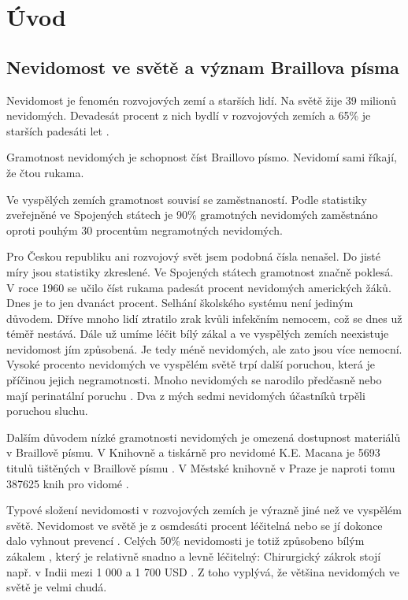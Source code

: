 
\chapter{Úvod}

\section{Nevidomost ve světě a význam Braillova písma}

Nevidomost je fenomén rozvojových zemí a starších lidí. Na světě žije 39 milionů nevidomých. Devadesát procent z nich bydlí v rozvojových zemích a 65\% je starších padesáti let \citep{whodata}.

Gramotnost nevidomých je schopnost číst Braillovo písmo.  Nevidomí sami říkají, že čtou rukama.

Ve vyspělých zemích gramotnost souvisí se zaměstnaností. Podle statistiky zveřejněné ve Spojených státech je 90\% gramotných nevidomých zaměstnáno oproti pouhým 30 procentům negramotných nevidomých.

Pro Českou republiku ani rozvojový svět jsem podobná čísla nenašel.  Do jisté míry jsou statistiky zkreslené.  Ve Spojených státech gramotnost značně poklesá.  V roce 1960 se učilo číst rukama padesát procent nevidomých amerických žáků. Dnes je to jen dvanáct procent.  Selhání školského systému není jediným důvodem. Dříve mnoho lidí ztratilo zrak kvůli infekčním nemocem, což se dnes už téměř nestává. Dále už umíme léčit bílý zákal a ve vyspělých zemích neexistuje nevidomost jím způsobená.  Je tedy méně nevidomých, ale zato jsou více nemocní.  Vysoké procento nevidomých ve vyspělém světě trpí další poruchou, která je příčinou jejich negramotnosti.  Mnoho nevidomých se narodilo předčasně nebo mají perinatální poruchu  \citep{perkins,whozakal,whodata}.  Dva z mých sedmi nevidomých účastníků trpěli poruchou sluchu.

Dalším důvodem nízké gramotnosti nevidomých je omezená dostupnost materiálů v Braillově písmu.  V Knihovně a tiskárně pro nevidomé K.E. Macana je 5693 titulů tištěných v Braillově písmu \citep{biblio}. V Městské knihovně v Praze je naproti tomu 387625 knih pro vidomé  \citep{mlp}.

Typové složení nevidomosti v rozvojových zemích je výrazně jiné než ve vyspělém světě. Nevidomost ve světě je z osmdesáti procent léčitelná nebo se jí dokonce dalo vyhnout prevencí \citep{whodata}.  Celých 50\% nevidomosti je totiž způsobeno bílým zákalem \citep{whozakal}, který je relativně snadno a levně léčitelný: Chirurgický zákrok stojí např. v Indii mezi 1 000 a 1 700 USD \citep{cataractsindia}. Z toho vyplývá, že většina nevidomých ve světě je velmi chudá.

